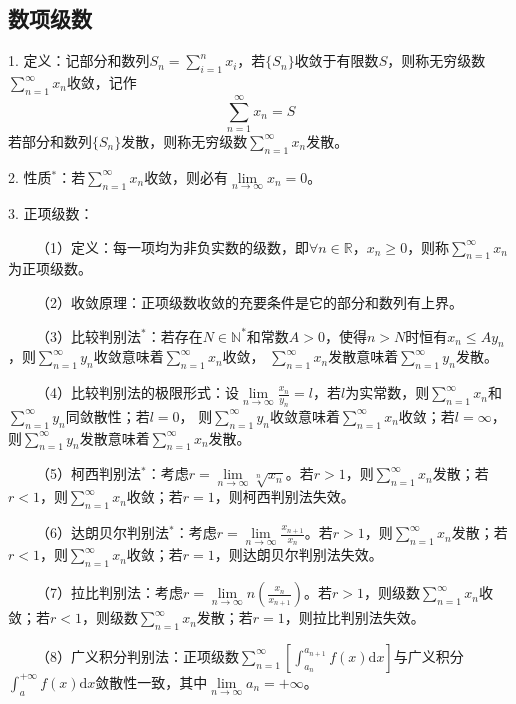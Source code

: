 \subsection{数项级数}

1. 定义：记部分和数列$S_n=\sum\limits_{i=1}^n x_i$，若$\{S_n\}$收敛于有限数$S$，则称无穷级数$\sum\limits_{n=1}^\infty x_n$收敛，记作
\begin{equation*}
    \sum\limits_{n=1}^\infty x_n = S
\end{equation*}
若部分和数列$\{S_n\}$发散，则称无穷级数$\sum\limits_{n=1}^\infty x_n$发散。

2. 性质$^*$：若$\sum\limits_{n=1}^\infty x_n$收敛，则必有$\lim\limits_{n\rightarrow\infty} x_n=0$。

3. 正项级数：

~~~~（1）定义：每一项均为非负实数的级数，即$\forall n\in \mathbb{R}$，$x_n \geqslant 0$，则称$\sum\limits_{n=1}^\infty x_n$为正项级数。

~~~~（2）收敛原理：正项级数收敛的充要条件是它的部分和数列有上界。

~~~~（3）比较判别法$^*$：若存在$N\in \mathbb{N}^*$和常数$A>0$，使得$n>N$时恒有$x_n\leqslant A y_n$，则$\sum\limits_{n=1}^\infty y_n$收敛意味着$\sum\limits_{n=1}^\infty x_n$收敛，
$\sum\limits_{n=1}^\infty x_n$发散意味着$\sum\limits_{n=1}^\infty y_n$发散。

~~~~（4）比较判别法的极限形式：设$\lim\limits_{n\rightarrow\infty}\frac{x_n}{y_n}=l$，若$l$为实常数，则$\sum\limits_{n=1}^\infty x_n$和$\sum\limits_{n=1}^\infty y_n$同敛散性；若$l=0$，
则$\sum\limits_{n=1}^\infty y_n$收敛意味着$\sum\limits_{n=1}^\infty x_n$收敛；若$l=\infty$，则$\sum\limits_{n=1}^\infty y_n$发散意味着$\sum\limits_{n=1}^\infty x_n$发散。

~~~~（5）柯西判别法$^*$：考虑$r=\lim\limits_{n\rightarrow\infty}\sqrt[n]{x_n}$。若$r>1$，则$\sum\limits_{n=1}^\infty x_n$发散；若$r<1$，则$\sum\limits_{n=1}^\infty x_n$收敛；若$r=1$，则柯西判别法失效。

~~~~（6）达朗贝尔判别法$^*$：考虑$r=\lim\limits_{n\rightarrow\infty}\frac{x_{n+1}}{x_n}$。若$r>1$，则$\sum\limits_{n=1}^\infty x_n$发散；若$r<1$，则$\sum\limits_{n=1}^\infty x_n$收敛；若$r=1$，则达朗贝尔判别法失效。

~~~~（7）拉比判别法：考虑$r=\lim\limits_{n\rightarrow\infty}n\left(\frac{x_n}{x_{n+1}}\right)$。若$r>1$，则级数$\sum\limits_{n=1}^\infty x_n$收敛；若$r<1$，则级数$\sum\limits_{n=1}^\infty x_n$发散；若$r=1$，则拉比判别法失效。

~~~~（8）广义积分判别法：正项级数$\sum\limits_{n=1}^\infty \left[\int_{a_n}^{a_{n+1}}f(x)\mathrm{d}x\right]$与广义积分$\int_a^{+\infty}f(x)\mathrm{d}x$敛散性一致，其中$\lim\limits_{n\rightarrow\infty} a_n=+\infty$。

